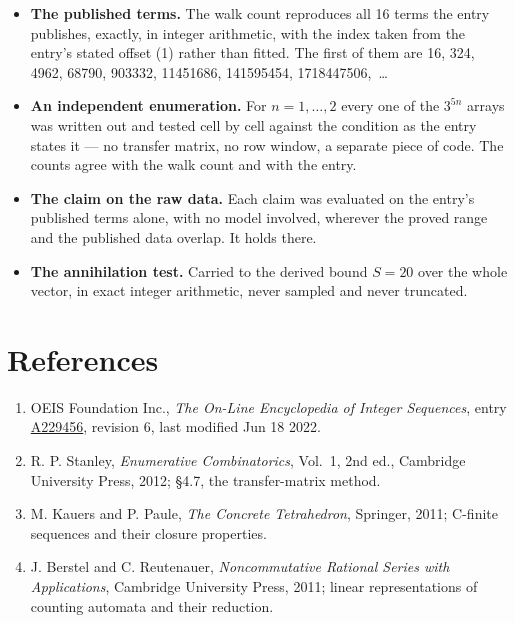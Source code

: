 \documentclass[11pt]{article}
\theoremstyle{definition}
\begin{document}
\begin{itemize}

\item {\bfseries The published terms.} The walk count reproduces all 16 terms the entry publishes, exactly, in integer arithmetic, with the index taken from the entry's stated offset (1) rather than fitted. The first of them are 16, 324, 4962, 68790, 903332, 11451686, 141595454, 1718447506,~\dots

\item {\bfseries An independent enumeration.} For $n = 1,\dots,2$ every one of the $3^{5n}$ arrays was written out and tested cell by cell against the condition as the entry states it --- no transfer matrix, no row window, a separate piece of code. The counts agree with the walk count and with the entry.

\item {\bfseries The claim on the raw data.} Each claim was evaluated on the entry's published terms alone, with no model involved, wherever the proved range and the published data overlap. It holds there.

\item {\bfseries The annihilation test.} Carried to the derived bound $S = 20$ over the whole vector, in exact integer arithmetic, never sampled and never truncated.

\end{itemize}

\section{References}

\begin{enumerate}

\item OEIS Foundation Inc., \emph{The On-Line Encyclopedia of Integer Sequences}, entry \href{https://oeis.org/A229456}{A229456}, revision 6, last modified Jun 18 2022.

\item R. P. Stanley, \emph{Enumerative Combinatorics}, Vol.~1, 2nd ed., Cambridge University Press, 2012; \S4.7, the transfer-matrix method.

\item M. Kauers and P. Paule, \emph{The Concrete Tetrahedron}, Springer, 2011; C-finite sequences and their closure properties.

\item J. Berstel and C. Reutenauer, \emph{Noncommutative Rational Series with Applications}, Cambridge University Press, 2011; linear representations of counting automata and their reduction.

\end{enumerate}
\end{document}

